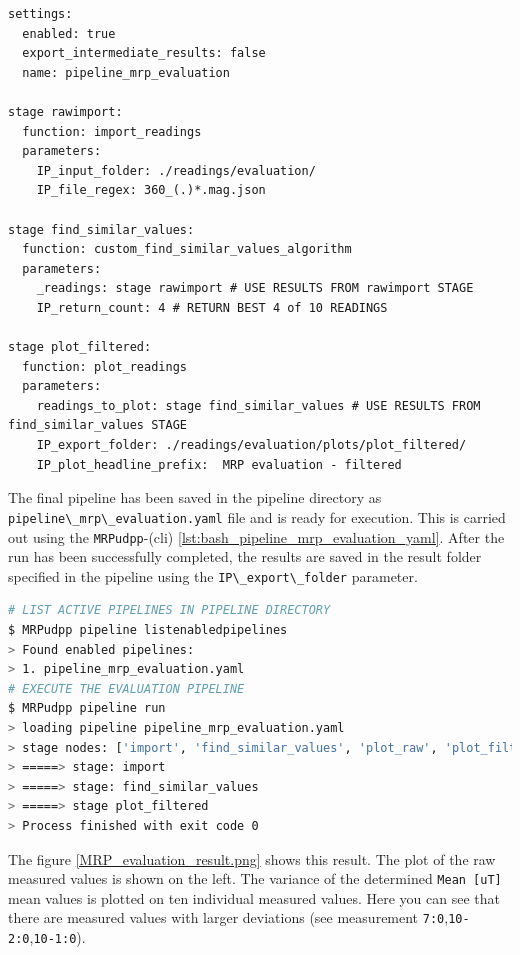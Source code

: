 \begin{lstlisting}[caption={User defined processing pipeline using custom implemented filter algorithm}, label=lst:pipeline_mrp_evaluation_yaml]
settings:
  enabled: true
  export_intermediate_results: false
  name: pipeline_mrp_evaluation

stage rawimport:
  function: import_readings
  parameters:
    IP_input_folder: ./readings/evaluation/
    IP_file_regex: 360_(.)*.mag.json

stage find_similar_values:
  function: custom_find_similar_values_algorithm
  parameters:
    _readings: stage rawimport # USE RESULTS FROM rawimport STAGE
    IP_return_count: 4 # RETURN BEST 4 of 10 READINGS

stage plot_filtered:
  function: plot_readings
  parameters:
    readings_to_plot: stage find_similar_values # USE RESULTS FROM find_similar_values STAGE
    IP_export_folder: ./readings/evaluation/plots/plot_filtered/
    IP_plot_headline_prefix:  MRP evaluation - filtered
\end{lstlisting}

The final pipeline has been saved in the pipeline directory as
\passthrough{\lstinline!pipeline\_mrp\_evaluation.yaml!} file and is
ready for execution. This is carried out using the
\passthrough{\lstinline!MRPudpp!}-(cli)
\ref{lst:bash_pipeline_mrp_evaluation_yaml}. After the run has been
successfully completed, the results are saved in the result folder
specified in the pipeline using the
\passthrough{\lstinline!IP\_export\_folder!} parameter.

\begin{lstlisting}[language=bash, caption={Bash result log of evaluation pipeline run}, label=lst:bash_pipeline_mrp_evaluation_yaml]
# LIST ACTIVE PIPELINES IN PIPELINE DIRECTORY 
$ MRPudpp pipeline listenabledpipelines
> Found enabled pipelines:
> 1. pipeline_mrp_evaluation.yaml
# EXECUTE THE EVALUATION PIPELINE
$ MRPudpp pipeline run
> loading pipeline pipeline_mrp_evaluation.yaml
> stage nodes: ['import', 'find_similar_values', 'plot_raw', 'plot_filtered']
> =====> stage: import 
> =====> stage: find_similar_values 
> =====> stage plot_filtered 
> Process finished with exit code 0
\end{lstlisting}

The figure \ref{MRP_evaluation_result.png} shows this result. The plot
of the raw measured values is shown on the left. The variance of the
determined \passthrough{\lstinline!Mean [uT]!} mean values is plotted on
ten individual measured values. Here you can see that there are measured
values with larger deviations (see measurement
\passthrough{\lstinline!7:0!},\passthrough{\lstinline!10-2:0!},\passthrough{\lstinline!10-1:0!}).

